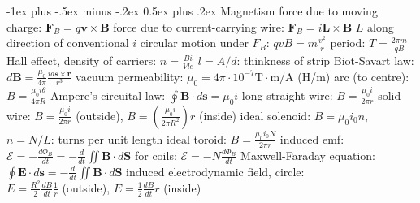 \documentclass[10pt,landscape]{article}
\makeatletter
\renewcommand{\subsection}{\@startsection{subsection}{2}{0mm}%
                                {-1ex plus -.5ex minus -.2ex}%
                                {0.5ex plus .2ex}%
                                {\normalfont\normalsize\bfseries}}
\newcommand{\spc}{\hspace*{1em}}
\makeatother
\begin{document}
\begin{multicols*}{3}
\subsection{Magnetism}
force due to moving charge: $\mathbf{F}_B=q\mathbf{v}\times \mathbf{B}$
\newline
force due to current-carrying wire: $\mathbf{F}_B=i\mathbf{L}\times \mathbf{B}$ \newline
\spc $L$ along direction of conventional $i$
\newline
circular motion under $F_B$: $qvB=m\frac{v^2}{r}$
\newline
\spc period: $T=\frac{2\pi m}{qB}$
\newline
Hall effect, density of carriers: $n=\frac{Bi}{Vle}$
\newline
\spc $l=A/d$: thinkness of strip
\newline
Biot-Savart law: $d\mathbf{B}=\frac{\mu _0}{4\pi }\frac{id\mathbf{s\times \mathbf{r}}}{r^3}$
\newline
vacuum permeability: $\mu_0=4\pi\cdot10^{-7}\textrm{T}\cdot \textrm{m}/\textrm{A}$ (H/m)
\newline
\spc arc (to centre): $B=\frac{\mu _0i\theta }{4\pi R}$
\newline \newline
Ampere's circuital law: $\oint \mathbf{B}\cdot d\mathbf{s}=\mu _0i$
\newline
\spc long straight wire: $B=\frac{\mu _0i}{2\pi r}$
\newline
\spc solid wire: $B=\frac{\mu _0i}{2\pi r}$ (outside), $B=(\frac{\mu _0i}{2\pi R^2})r$ (inside)
\newline
\spc ideal solenoid: $B=\mu _0i_0n$, $n=N/L$: turns per unit length
\newline
\spc ideal toroid: $B=\frac{\mu _0i_0N}{2\pi r}$
\newline \newline
induced emf: $\mathscr{E} =-\frac{d\Phi _B}{dt}=-\frac{d}{dt} \iint \mathbf{B} \cdot d\mathbf{S}$
\newline
\spc for coils: $\mathscr{E} =-N\frac{d\Phi _B}{dt}$
\newline
Maxwell-Faraday equation: $\oint \mathbf{E}\cdot d\mathbf{s}=-\frac{d}{dt} \iint \mathbf{B}\cdot d\mathbf{S}$
\newline
\spc induced electrodynamic field, circle:
\\\spc$E=\frac{R^2}{2}\frac{dB}{dt}\frac{1}{r}$ (outside), $E=\frac{1}{2}\frac{dB}{dt}r$ (inside)


\end{multicols*}
\end{document}
